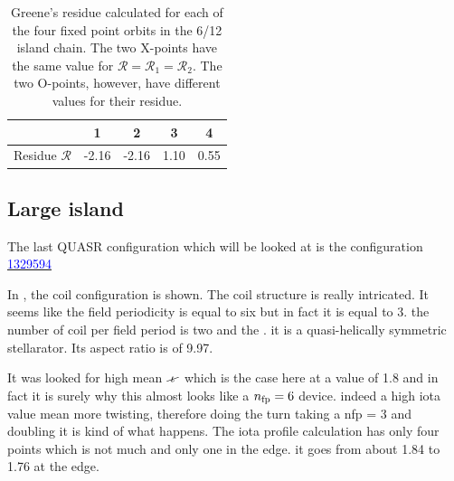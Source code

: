 \begin{table}[H]
    \centering
    \begin{tabular}{c|c|c|c|c}
         & 1 & 2 & 3 & 4 \\
         \hline Residue $\mathcal{R}$ & -2.16 & -2.16 & 1.10 & 0.55
    \end{tabular}
    \caption{Greene's residue calculated for each of the four fixed point orbits in the 6/12 island chain. The two X-points have the same value for $\mathcal{R} = \mathcal{R}_1 = \mathcal{R}_2$. The two O-points, however, have different values for their residue.}
    \label{tab:greenes}
\end{table}

\subsection{Large island}\label{sec:quars-1329594}

The last QUASR configuration which will be looked at is the configuration \href{https://quasr.flatironinstitute.org/model/1329594}{\textcolor{blue}{1329594}}

In , the coil configuration is shown. The coil structure is really intricated. It seems like the field periodicity is equal to six but in fact it is equal to 3. the number of coil per field period is two and the . it is a quasi-helically symmetric stellarator. Its aspect ratio is of 9.97. 

It was looked for high mean $\iotaslash$ which is the case here at a value of 1.8 and in fact it is surely why this almost looks like a $n_\text{fp} = 6$ device. indeed a high iota value mean more twisting, therefore doing the turn taking a nfp = 3 and doubling it is kind of what happens. The iota profile calculation has only four points which is not much and only one in the edge. it goes from about 1.84 to 1.76 at the edge.


